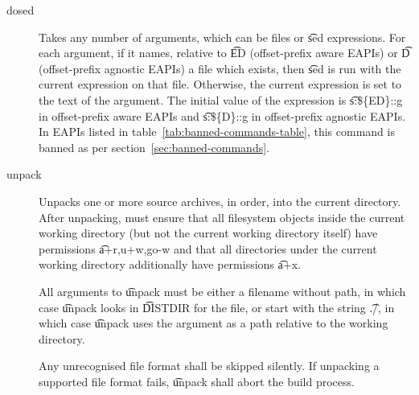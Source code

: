 \begin{description}
\item[dosed] Takes any number of arguments, which can be files or \t{sed} expressions. For each
    argument, if it names, relative to \t{ED} (offset-prefix aware EAPIs) or \t{D} (offset-prefix agnostic
    EAPIs) a file which exists, then \t{sed} is run with the current expression on that file. Otherwise,
    the current expression is set to the text of the argument. The initial value of the expression is
    \t{s:\$\{ED\}::g} in offset-prefix aware EAPIs and \t{s:\$\{D\}::g} in offset-prefix agnostic
    EAPIs. In EAPIs listed in table~\ref{tab:banned-commands-table}, this command is banned as per
    section~\ref{sec:banned-commands}.

\item[unpack] Unpacks one or more source archives, in order, into the current directory. After
    unpacking, must ensure that all filesystem objects inside the current working directory (but not
    the current working directory itself) have permissions \t{a+r,u+w,go-w} and that all directories
    under the current working directory additionally have permissions \t{a+x}.

    All arguments to \t{unpack} must be either a filename without path, in which case \t{unpack}
    looks in \t{DISTDIR} for the file, or start with the string \t{./}, in which case \t{unpack}
    uses the argument as a path relative to the working directory.

    Any unrecognised file format shall be skipped silently. If unpacking a supported file format
    fails, \t{unpack} shall abort the build process.


\end{description}
